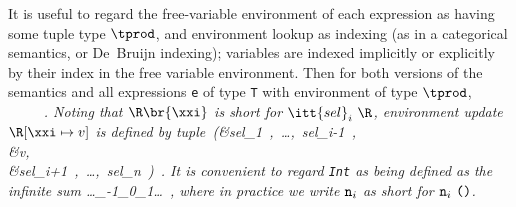 It is useful to regard the free-variable environment of each expression
as having some tuple type $\tprod$, and environment lookup as indexing
(as in a categorical semantics, or De~Bruijn indexing); variables are
indexed implicitly or explicitly by their index in the free variable
environment.  Then for both versions of the semantics and all
expressions \mbox{\tt e} of type \mbox{\tt T} with environment of type $\tprod$,
\beqs
\it {}\ \in\ \Te{}{\tprod}~\fto~\ .
\eeqs
Noting that $\R\br{\xxi}$ is short for $\itt{sel}_i~\R$, environment
update $\R[\xxi\mapsto{}v]$ is defined by
\beqqs
\it tuple\ (&\it sel_{\rm1}\ \R,\ \ldots,\ sel_{i-{\rm1}}\ \R,\\
\it &\it v,\\
\it &\it sel_{i+{\rm1}}\ \R,\ \ldots,\ sel_n\ \R)\ .
\eeqqs
It is convenient to regard \mbox{\tt Int} as being defined as the infinite sum
\beqs
\it \tint\makebox{\tt \ =\ }\ldots{}_{-{\rm1}}_{{\rm0}}_{{\rm1}}\makebox{\tt \ ()\ +\ }\ldots\ ,
\eeqs
where in practice we write $\mbox{\tt n}_i$ as short for $\mbox{\tt n}_i~\mbox{\tt ()}$.


